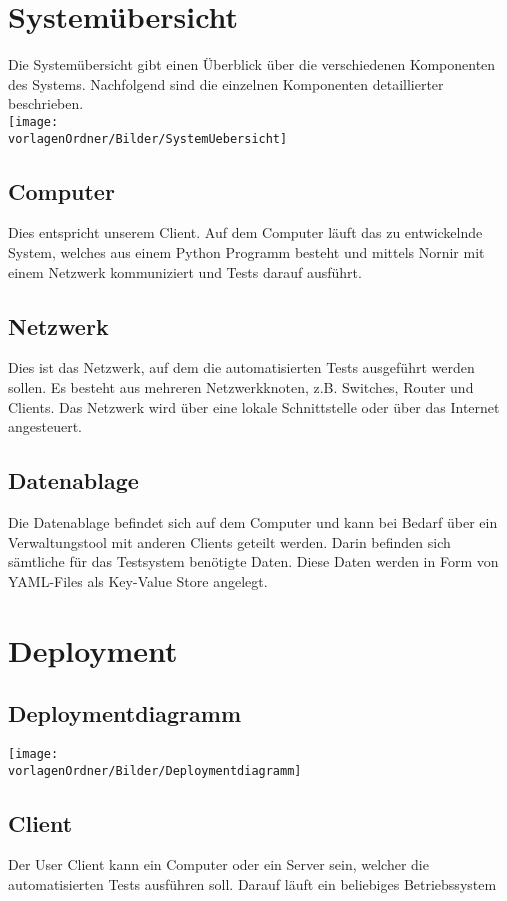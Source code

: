 \documentclass[
	ngerman,
	toc=listof, %
	toc=bibliography, %
	footnotes=multiple, %
	parskip=half, %
	numbers=noendperiod %
]{scrartcl}
\newcommand{\vorlagenOrdner}{../../99_Vorlagen} %
\begin{document}
\section{Systemübersicht}
	Die Systemübersicht gibt einen Überblick über die verschiedenen Komponenten des Systems. Nachfolgend sind die einzelnen Komponenten detaillierter beschrieben.\\
	\texttt{[image: \\vorlagenOrdner/Bilder/SystemUebersicht]}

	\subsection{Computer}
		Dies entspricht unserem Client.
		Auf dem Computer läuft das zu entwickelnde System, welches aus einem Python Programm besteht und mittels Nornir mit einem Netzwerk kommuniziert und Tests darauf ausführt.

	\subsection{Netzwerk}
		Dies ist das Netzwerk, auf dem die automatisierten Tests ausgeführt werden sollen. 
		Es besteht aus mehreren Netzwerkknoten, z.B. Switches, Router und Clients.
		Das Netzwerk wird über eine lokale Schnittstelle oder über das Internet angesteuert.

	\subsection{Datenablage}
		Die Datenablage befindet sich auf dem Computer und kann bei Bedarf über ein Verwaltungstool mit anderen Clients geteilt werden. 
		Darin befinden sich sämtliche für das Testsystem benötigte Daten.
		Diese Daten werden in Form von YAML-Files als Key-Value Store angelegt.

\section{Deployment}
	\subsection{Deploymentdiagramm}
		\texttt{[image: \\vorlagenOrdner/Bilder/Deploymentdiagramm]}
	
		\subsection{Client}
		Der User Client kann ein Computer oder ein Server sein, welcher die automatisierten Tests ausführen soll.
		Darauf läuft ein beliebiges Betriebssystem
\end{document}
